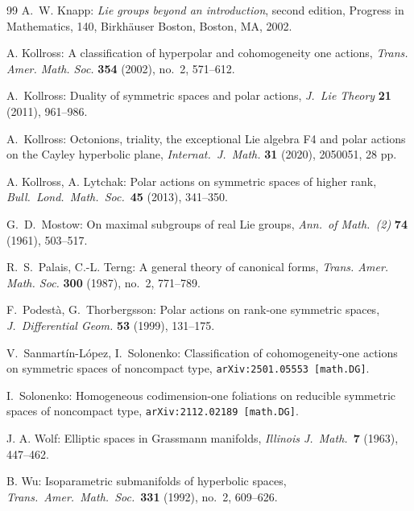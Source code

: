 \documentclass[12pt, a4paper]{amsart}
\theoremstyle{definition}
\begin{document}
\begin{thebibliography}{99}
A.~W. Knapp: \emph{Lie groups beyond an introduction}, second edition, 
Progress in Mathematics, 140, Birkh\"auser Boston, Boston, MA, 2002.

A. Kollross: A classification of hyperpolar and cohomogeneity one actions,
\textit{Trans. Amer. Math. Soc.} {\bf 354} (2002), no.~2, 571--612.

A.~Kollross: Duality of symmetric spaces and polar actions, 
\textit{J.\ Lie Theory} \textbf{21} (2011), 961--986.

A.~Kollross: Octonions, triality, the exceptional Lie algebra F4 and polar actions on the Cayley hyperbolic plane, 
\textit{Internat.\ J.\ Math.} \textbf{31} (2020), 2050051, 28 pp.

A. Kollross, A. Lytchak: Polar actions on symmetric spaces of higher rank,
\textit{Bull.\ Lond.\ Math.\ Soc.}\ \textbf{45} (2013), 341--350.

{G.~D.~Mostow}: On maximal subgroups of real Lie groups, 
\textit{Ann.\ of Math.\ (2)} \textbf{74} (1961), 503--517.

R.~S.~Palais, C.-L. Terng: A general theory of canonical forms,
{\it Trans. Amer. Math. Soc.} {\bf 300} (1987), no.~2, 771--789.

F.~Podest\`{a}, G.~Thorbergsson: Polar actions on rank-one symmetric spaces, 
\textit{J.\ Differential Geom.} \textbf{53} (1999), 131--175.

V.~Sanmart\'{i}n-L\'{o}pez, I.~Solonenko:
Classification of cohomogeneity-one actions on symmetric spaces of noncompact type,
\verb|arXiv:2501.05553 [math.DG]|.

I.~Solonenko:
Homogeneous codimension-one foliations on reducible symmetric spaces of noncompact type,
\verb|arXiv:2112.02189 [math.DG]|.

J. A. Wolf: Elliptic spaces in Grassmann manifolds, 
\textit{Illinois J.\ Math.}\ \textbf{7} (1963),
447--462.

B. Wu: Isoparametric submanifolds of hyperbolic spaces, 
\textit{Trans.\ Amer.\ Math.\ Soc.}\ \textbf{331} (1992), no.~2, 609--626.
\end{thebibliography}
\end{document}
